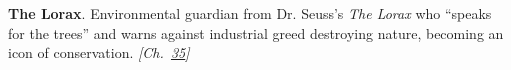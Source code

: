 \textbf{The Lorax}. Environmental guardian from Dr. Seuss's \emph{The Lorax} who ``speaks for the trees'' and warns against industrial greed destroying nature, becoming an icon of conservation. \emph{[Ch.~\hyperref[ch:treesfromair]{35}]}

